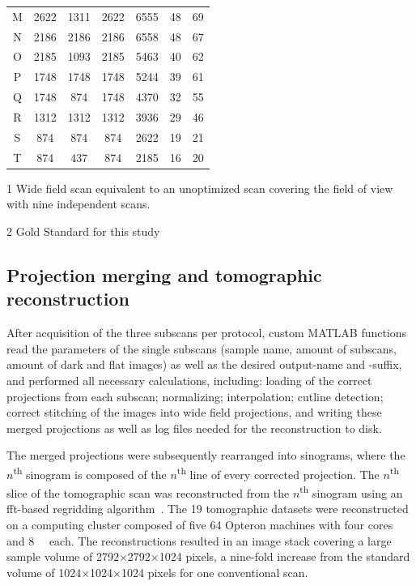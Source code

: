 {\begin{threeparttable}
\begin{tabular}{ccccccc}
		M & 2622 & 1311 & 2622 & 6555  &  48 & 69\\
		N & 2186 & 2186 & 2186 & 6558  &  48 & 67\\
		O & 2185 & 1093 & 2185 & 5463  &  40 & 62\\
		P & 1748 & 1748 & 1748 & 5244  &  39 & 61\\
		Q & 1748 & 874  & 1748 & 4370  &  32 & 55\\
		R & 1312 & 1312 & 1312 & 3936  &  29 & 46\\
		S & 874  & 874  & 874  & 2622  &  19 & 21\\
		\rowcolor{lightgray} T & 874  & 437  & 874  & 2185  &  16  & 20\\
		\bottomrule
	\end{tabular}
	\begin{tablenotes}
		\footnotesize
		\item[1] Wide field scan equivalent to an unoptimized scan covering the field of view with nine independent scans.
		\item[2] Gold Standard for this study
	\end{tablenotes}
\end{threeparttable}
}

\subsection{Projection merging and tomographic reconstruction}
After acquisition of the three subscans per protocol, custom MATLAB functions read the parameters of the single subscans (\eg sample name, amount of subscans, amount of dark and flat images) as well as the desired output-name and -suffix, and performed all necessary calculations, including: loading of the correct projections from each subscan; normalizing; interpolation; cutline detection; correct stitching of the images into wide field projections, and writing these merged projections as well as log files needed for the reconstruction to disk.

The merged projections were subsequently rearranged into sinograms, where the $n$\textsuperscript{th} sinogram is composed of the $n$\textsuperscript{th} line of every corrected projection. The $n$\textsuperscript{th} slice of the tomographic scan was reconstructed from the $n$\textsuperscript{th} sinogram using an \acs{fft}-based regridding algorithm~\cite{Dowd1999,Marone2008}. The 19 tomographic datasets were reconstructed on a computing cluster composed of five \SI{64}{\bit} Opteron machines with four cores and \SI{8}{\giga\byte}  each. The reconstructions resulted in an image stack covering a large sample volume of 2792$\times$2792$\times$1024 pixels, a nine-fold increase from the standard volume of 1024$\times$1024$\times$1024 pixels for one conventional scan.

